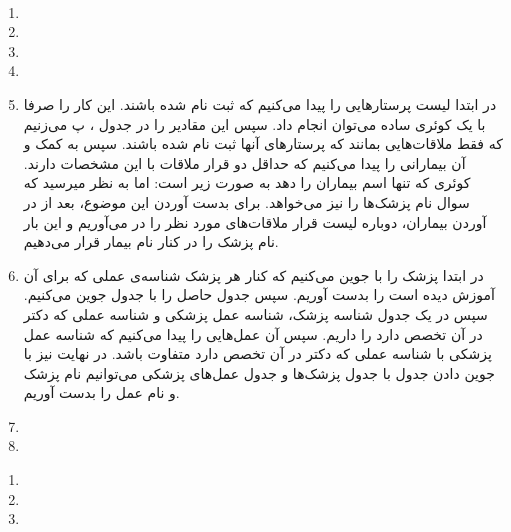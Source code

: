 \\
\begin{enumerate}
    \item \hfill {}
    \item \hfill {}
    \item \hfill {}
    \item \hfill {}
    \item در ابتدا لیست پرستار‌هایی را پیدا می‌کنیم که ثبت نام شده باشند. این کار را صرفا با یک کوئری ساده
    می‌توان انجام داد. سپس این مقادیر را در جدول
    ، پ
    می‌زنیم که فقط ملاقات‌هایی بمانند که پرستار‌های آنها ثبت نام شده باشند.
    سپس به کمک
     و 
    آن بیمارانی را پیدا می‌کنیم که حداقل دو قرار ملاقات با این مشخصات دارند. کوئری که تنها اسم بیماران را دهد
    به صورت زیر است:
    \noindent
    اما به نظر میرسید که سوال نام پزشک‌ها را نیز می‌خواهد. برای بدست آوردن این موضوع، بعد از در آوردن
    بیماران، دوباره لیست قرار ملاقات‌های مورد نظر را در می‌آوریم و این بار نام پزشک را
    در کنار نام بیمار قرار می‌دهیم.
    \item در ابتدا پزشک را با
    جوین می‌کنیم که کنار هر پزشک شناسه‌ی عملی که برای آن آموزش دیده است را بدست آوریم.
    سپس جدول حاصل را با جدول
    جوین می‌کنیم. سپس در یک جدول شناسه پزشک، شناسه عمل پزشکی و شناسه عملی که دکتر در آن تخصص دارد را داریم.
    سپس آن عمل‌هایی را پیدا می‌کنیم که شناسه عمل پزشکی با شناسه عملی که دکتر در آن تخصص دارد متفاوت باشد.
    در نهایت نیز با جوین دادن جدول با جدول پزشک‌ها و جدول عمل‌های پزشکی می‌توانیم نام پزشک و نام عمل را بدست
    آوریم.
    \item \hfill {}
    \item \hfill {}
\end{enumerate}
\begin{enumerate}
    \item \hfill {}
    \item \hfill {}
    \item \hfill {}
\end{enumerate}

